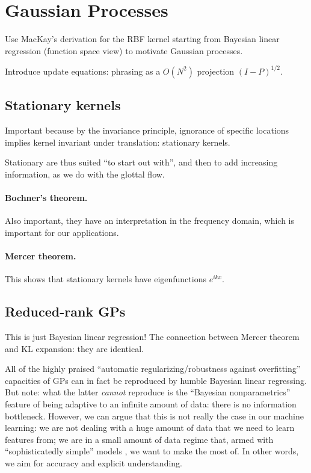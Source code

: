 \section{Gaussian Processes}


Use MacKay's derivation for the RBF kernel starting from Bayesian linear regression (function space view) to motivate Gaussian processes.

Introduce update equations: phrasing as a $O(N^2)$ projection $(I - P)^{1/2}$.

\subsection{Stationary kernels}

Important because by the invariance principle, ignorance of specific locations implies kernel invariant under translation: stationary kernels.

Stationary are thus suited ``to start out with'', and then to add increasing information, as we do with the glottal flow.

\paragraph{Bochner's theorem.} Also important, they have an interpretation in the frequency domain, which is important for our applications.

\paragraph{Mercer theorem.} This shows that stationary kernels have eigenfunctions $e^{ikx}$.

\subsection{Reduced-rank GPs}

This is just Bayesian linear regression! The connection between Mercer theorem and KL expansion: they are identical.

All of the highly praised ``automatic regularizing/robustness against overfitting'' capacities of GPs can in fact be reproduced by humble Bayesian linear regressing.
But note: what the latter \emph{cannot} reproduce is the ``Bayesian nonparametrics'' feature of being adaptive to an infinite amount of data: there is no information bottleneck.
However, we can argue that this is not really the case in our machine learning: we are not dealing with a huge amount of data that we need to learn features from; we are in a small amount of data regime that, armed with ``sophisticatedly simple'' models \citep{Jaynes1985}, we want to make the most of.
In other words, we aim for accuracy and explicit understanding.


